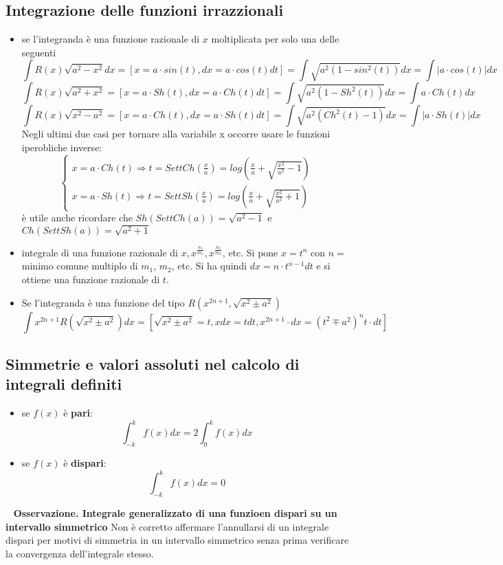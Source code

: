 \subsection{Integrazione delle funzioni irrazzionali}
\begin{itemize}
    \item se l'integranda è una funzione razionale di $x$ moltiplicata per solo una delle seguenti
    \[
        \int R(x) \sqrt{a^2-x^2} dx = [x=a \cdot  sin(t), dx =a \cdot  cos(t)dt] = \int \sqrt{a^2(1-sin^2(t))}dx = \int|a \cdot  cos(t)|dx
    \]
    \[
        \int R(x) \sqrt{a^2 + x^2} = [x=a \cdot  Sh(t), dx =a \cdot  Ch(t)dt] = \int \sqrt{a^2(1-Sh^2(t))}dx = \int a \cdot  Ch(t)dx
    \]
    \[
        \int R(x) \sqrt{x^2 -a^2} = [x=a \cdot  Ch(t), dx =a \cdot Sh(t)dt] = \int \sqrt{a^2(Ch^2(t)-1)}dx = \int|a \cdot Sh(t)|dx
    \]
    Negli ultimi due casi per tornare alla variabile x occorre usare le funzioni iperobliche inverse:
    \[
        \begin{cases}
            x = a \cdot  Ch(t) \Rightarrow t = SettCh(\frac{x}{a}) = log\left(\frac{x}{a}+\sqrt{\frac{x^2}{a^2}-1}\right)\\
            x= a \cdot Sh(t) \Rightarrow t = SettSh\left(\frac{x}{a}\right) = log\left(\frac{x}{a}+\sqrt{\frac{x^2}{a^2}+1}\right)
        \end{cases}
    \]
    è utile anche ricordare che $Sh(SettCh(a))= \sqrt{a^2-1}$ e $Ch(SettSh(a))=\sqrt{a^2+1}$
    \item integrale di una funzione razionale di $x, x^{\frac{n_1}{m_1}}, x^{\frac{n_2}{m_2}}$, etc. \newline
    Si pone $x = t^n$ con $n=$ minimo comune multiplo di $m_1$, $m_2$, etc. Si ha quindi $dx = n \cdot  t^{n-1} dt$ e si ottiene una funzione razionale di $t$.
    \item Se l'integranda è una funzione del tipo $R(x^{2n+1}, \sqrt{x^2 \pm a^2})$
    \[
        \int x^{2n+1}R(\sqrt{x^2 \pm a^2})dx = [\sqrt{x^2 \pm a^2} = t, xdx= tdt, x^{2n+1} \cdot dx = (t^2 \mp a^2)^n t \cdot  dt]
    \]
\end{itemize}
\subsection{Simmetrie e valori assoluti nel calcolo di integrali definiti}
\begin{itemize}
    \item se $f(x)$ è \textbf{pari}:
    \[
        \int_{-k}^{k}f(x)dx = 2 \int_{0}^{k} f(x) dx
    \]
    \item se $f(x)$ è \textbf{dispari}:
    \[
        \int_{-k}^{k}f(x)dx = 0
    \]
\end{itemize}
\ \newline
\textbf{Osservazione. Integrale generalizzato di una funzioen dispari su un intervallo simmetrico}
Non è corretto affermare l'annullarsi di un integrale dispari per motivi di simmetria in un intervallo simmetrico senza prima verificare la convergenza dell'integrale stesso.

